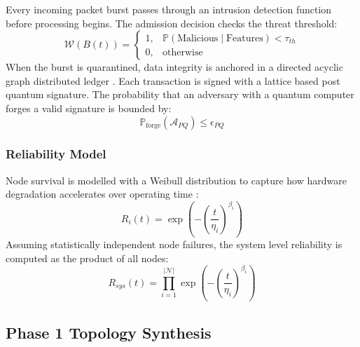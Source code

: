 \documentclass[a4paper,fleqn]{cas-dc}
\numberwithin{equation}{section}
\begin{document}
Every incoming packet burst passes through an intrusion detection function before processing begins. The admission decision checks the threat threshold:
\begin{equation}
\label{eq:watchdog}
\mathcal{W}\!\left(B(t)\right) =
\begin{cases}
1, & \mathbb{P}\!\left(\text{Malicious}\mid\text{Features}\right) < \tau_{th} \\
0, & \text{otherwise}
\end{cases}
\end{equation}
When the burst is quarantined, data integrity is anchored in a directed acyclic graph distributed ledger \cite{b3}. Each transaction is signed with a lattice based post quantum signature. The probability that an adversary with a quantum computer forges a valid signature is bounded by:
\begin{equation}
\label{eq:forge_prob}
\mathbb{P}_{\text{forge}}\!\left(\mathcal{A}_{PQ}\right) \leq \epsilon_{PQ}
\end{equation}

\subsubsection*{Reliability Model}

Node survival is modelled with a Weibull distribution to capture how hardware degradation accelerates over operating time \cite{b6, b1}:
\begin{equation}
\label{eq:weibull}
R_i(t) = \exp\!\left(-\!\left(\frac{t}{\eta_i}\right)^{\!\beta_i}\right)
\end{equation}
Assuming statistically independent node failures, the system level reliability is computed as the product of all nodes:
\begin{equation}
\label{eq:system_reliability}
R_{sys}(t) = \prod_{i=1}^{|\mathcal{N}|} \exp\!\left(-\!\left(\frac{t}{\eta_i}\right)^{\!\beta_i}\right)
\end{equation}

\subsection{Phase 1 Topology Synthesis}
\end{document}
